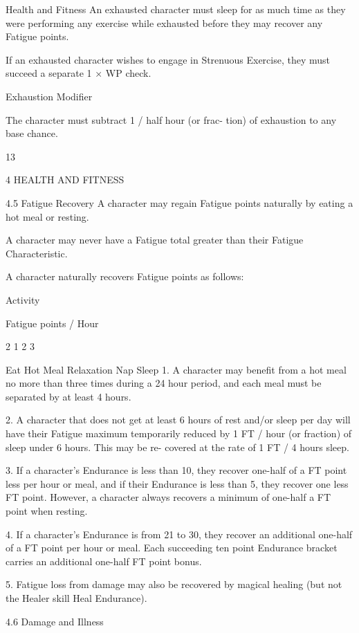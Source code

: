 \begin{Chapter}{Health and Fitness}
An  exhausted  character  must  sleep  for  as  much 
time  as  they  were  performing  any  exercise  while 
exhausted  before  they  may  recover  any  Fatigue 
points. 

If  an  exhausted  character  wishes  to  engage  in 
Strenuous Exercise, they must succeed a separate 1 
× WP check. 

Exhaustion Modifier 

The  character  must  subtract 1  /  half  hour  (or  frac-
tion) of exhaustion to any base chance. 

13 

4 HEALTH AND FITNESS 

4.5 Fatigue Recovery 
A character may regain Fatigue points naturally by 
eating a hot meal or resting. 

A character may never have a Fatigue total greater 
than their Fatigue Characteristic. 

A  character  naturally  recovers  Fatigue  points  as 
follows: 

Activity 

Fatigue points / Hour 

2 
1 
2 
3 

Eat Hot Meal 
Relaxation 
Nap  
Sleep  
1.  A  character  may  benefit  from  a  hot  meal  no 
more than three times during a 24 hour period, and 
each meal must be separated by at least 4 hours. 

2. A character that does not get at least 6 hours of 
rest  and/or  sleep  per  day  will  have  their  Fatigue 
maximum  temporarily  reduced  by  1  FT  /  hour  (or 
fraction)  of  sleep  under  6  hours.  This  may  be  re-
covered at the rate of 1 FT / 4 hours sleep. 

3.  If  a  character’s  Endurance  is  less  than  10,  they 
recover  one-half  of  a  FT  point  less  per  hour  or 
meal,  and  if  their  Endurance  is  less  than  5,  they 
recover  one  less  FT  point.  However,  a  character 
always recovers a minimum of one-half a FT point 
when resting. 

4. If a character’s Endurance is from 21 to 30, they 
recover  an  additional  one-half  of  a  FT  point  per 
hour or meal. Each succeeding ten point Endurance 
bracket  carries  an  additional  one-half  FT  point 
bonus. 

5. Fatigue loss from damage may also be recovered 
by  magical  healing  (but  not  the  Healer  skill  Heal 
Endurance). 

4.6 Damage and Illness 


\end{Chapter}
